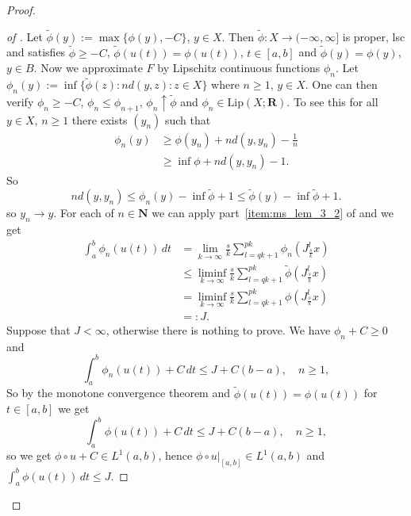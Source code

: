 \documentclass[a4paper,11pt, leqno]{scrreprt} %
\renewcommand{\leq}{\leqslant}
\renewcommand{\leq}{\leqslant}
\renewcommand{\geq}{\geqslant}
\newcommand{\R}{\mathbf R}
\newcommand{\N}{\mathbf N}
\theoremstyle{change}
\theoremstyle{nonumberplain}
\newtheorem{proof}{Proof}
\begin{document}
\begin{proof}
\begin{proof}[of ]
    Let $\tilde \phi(y) := \max \{\phi(y), -C\}$, $y \in X$. Then
    $\tilde \phi : X \to (-\infty, \infty]$ is proper, lsc and
    satisfies $\tilde \phi \geq -C$, $\tilde \phi(u(t)) = \phi(u(t))$,
    $t \in [a,b]$ and $\tilde \phi(y) = \phi(y)$, $y \in B$. Now we
    approximate $F$ by Lipschitz continuous functions $\phi_n$. Let
    $\phi_n(y) := \inf \{\tilde \phi(z) : n d(y, z) : z \in X \}$
    where $n \geq 1$, $y \in X$. One can then verify $\phi_n \geq -C$,
    $\phi_n \leq \phi_{n + 1}$, $\phi_n \uparrow \tilde \phi$ and
    $\phi_n \in \text{Lip}(X; \R)$. To see
    this for all $y \in X$, $n \geq 1$ there exists $(y_n)$ such that
    \begin{equation}
      \label{eq:ms_thm_1_61}
      \begin{split}
        \phi_n(y) &\geq \phi(y_n) + n d(y, y_n) - \frac1n\\
        & \geq \inf \phi + n d(y, y_n) - 1.
      \end{split}
    \end{equation}
    So
    \begin{equation}
      \label{eq:ms_thm_1_61}
      n d(y, y_n) \leq \phi_n(y) - \inf \tilde \phi + 1 \leq \tilde
      \phi(y) - \inf \tilde \phi + 1.
    \end{equation}
    so $y_n \to y$.  For each of $n \in \N$ we can
    apply part~\ref{item:ms_lem_3_2} of  and we
    get
    \begin{equation}
      \label{eq:ms_thm_1_62}
      \begin{split}
        \int_a^b \phi_n(u(t)) \, dt &= \lim_{k \to \infty} \frac{s}{k}
        \sum_{l = qk + 1}^{pk} \phi_n \left ( J_{\frac{s}{k}}^l x
        \right )\\
        &\leq \liminf_{k \to \infty} \frac{s}{k} \sum_{l = qk +
          1}^{pk} \tilde \phi \left ( J_{\frac{s}{k}}^l x
        \right )\\
        &= \liminf_{k \to \infty} \frac{s}{k} \sum_{l = qk +
          1}^{pk} \phi \left ( J_{\frac{s}{k}}^l x
        \right )\\
        &=: J.
      \end{split}
    \end{equation}
    Suppose that $J < \infty$, otherwise there is nothing to prove. We
    have $\phi_n + C \geq 0$ and
    \begin{equation}
      \label{eq:ms_thm_1_63}
      \int_a^b \phi_n(u(t)) + C \, dt \leq J + C (b - a), \quad n \geq 1,
    \end{equation}
    So by the monotone convergence theorem and $\tilde \phi(u(t)) =
    \phi(u(t))$ for $t \in [a,b]$ we get
    \begin{equation}
     \label{eq:ms_thm_1_64}
      \int_a^b \phi(u(t)) + C \, dt \leq J + C (b - a), \quad n \geq 1,
    \end{equation}
    so we get $\phi \circ u + C \in L^1(a,b)$, hence $\phi \circ
    u|_{[a,b]} \in L^1(a,b)$ and $\int_a^b \phi(u(t)) \, dt \leq J$.
  \end{proof}


\end{proof}
\end{document}
